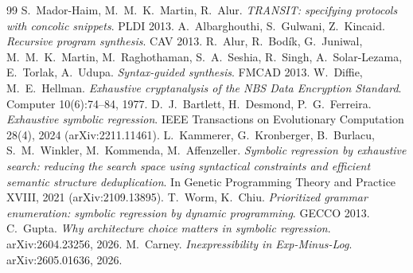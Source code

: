 \documentclass[11pt]{article}
\begin{document}
\begin{thebibliography}{99}
S.~Mador-Haim, M.~M.~K.~Martin, R.~Alur.
\emph{TRANSIT: specifying protocols with concolic snippets}. PLDI 2013.
 A.~Albarghouthi, S.~Gulwani, Z.~Kincaid.
\emph{Recursive program synthesis}. CAV 2013.
 R.~Alur, R.~Bod\'ik, G.~Juniwal, M.~M.~K.~Martin,
M.~Raghothaman, S.~A.~Seshia, R.~Singh, A.~Solar-Lezama, E.~Torlak,
A.~Udupa. \emph{Syntax-guided synthesis}. FMCAD 2013.
 W.~Diffie, M.~E.~Hellman.
\emph{Exhaustive cryptanalysis of the NBS Data Encryption Standard}.
Computer 10(6):74--84, 1977.
 D.~J.~Bartlett, H.~Desmond, P.~G.~Ferreira.
\emph{Exhaustive symbolic regression}. IEEE Transactions on
Evolutionary Computation 28(4), 2024 (arXiv:2211.11461).
 L.~Kammerer, G.~Kronberger, B.~Burlacu,
S.~M.~Winkler, M.~Kommenda, M.~Affenzeller. \emph{Symbolic
regression by exhaustive search: reducing the search space using
syntactical constraints and efficient semantic structure
deduplication}. In Genetic Programming Theory and Practice XVIII,
2021 (arXiv:2109.13895).
 T.~Worm, K.~Chiu. \emph{Prioritized grammar
enumeration: symbolic regression by dynamic programming}. GECCO 2013.
 C.~Gupta. \emph{Why architecture choice
matters in symbolic regression}. arXiv:2604.23256, 2026.
 M.~Carney. \emph{Inexpressibility in
Exp-Minus-Log}. arXiv:2605.01636, 2026.
\end{thebibliography}
\end{document}
